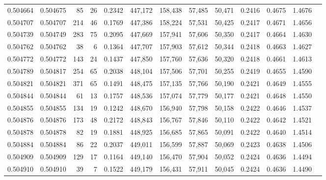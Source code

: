 \begin{tabular}{rrrrrrrrrrrrr}
0.504664 & 0.504675 &    85 &    26 &                                     0.2342 & 447,172 & 158,438 &  57,485 &  50,471 & 0.2416 & 0.4675 & 1.4676 \\
0.504707 & 0.504707 &   214 &    46 &                                     0.1769 & 447,386 & 158,224 &  57,531 &  50,425 & 0.2417 & 0.4671 & 1.4656 \\
0.504739 & 0.504749 &   283 &    75 &                                     0.2095 & 447,669 & 157,941 &  57,606 &  50,350 & 0.2417 & 0.4664 & 1.4630 \\
0.504762 & 0.504762 &    38 &     6 &                                     0.1364 & 447,707 & 157,903 &  57,612 &  50,344 & 0.2418 & 0.4663 & 1.4627 \\
0.504772 & 0.504772 &   143 &    24 &                                     0.1437 & 447,850 & 157,760 &  57,636 &  50,320 & 0.2418 & 0.4661 & 1.4613 \\
0.504789 & 0.504817 &   254 &    65 &                                     0.2038 & 448,104 & 157,506 &  57,701 &  50,255 & 0.2419 & 0.4655 & 1.4590 \\
0.504821 & 0.504821 &   371 &    65 &                                     0.1491 & 448,475 & 157,135 &  57,766 &  50,190 & 0.2421 & 0.4649 & 1.4555 \\
0.504844 & 0.504844 &    61 &    13 &                                     0.1757 & 448,536 & 157,074 &  57,779 &  50,177 & 0.2421 & 0.4648 & 1.4550 \\
0.504855 & 0.504855 &   134 &    19 &                                     0.1242 & 448,670 & 156,940 &  57,798 &  50,158 & 0.2422 & 0.4646 & 1.4537 \\
0.504876 & 0.504876 &   173 &    48 &                                     0.2172 & 448,843 & 156,767 &  57,846 &  50,110 & 0.2422 & 0.4642 & 1.4521 \\
0.504878 & 0.504878 &    82 &    19 &                                     0.1881 & 448,925 & 156,685 &  57,865 &  50,091 & 0.2422 & 0.4640 & 1.4514 \\
0.504884 & 0.504884 &    86 &    22 &                                     0.2037 & 449,011 & 156,599 &  57,887 &  50,069 & 0.2423 & 0.4638 & 1.4506 \\
0.504909 & 0.504909 &   129 &    17 &                                     0.1164 & 449,140 & 156,470 &  57,904 &  50,052 & 0.2424 & 0.4636 & 1.4494 \\
0.504910 & 0.504910 &    39 &     7 &                                     0.1522 & 449,179 & 156,431 &  57,911 &  50,045 & 0.2424 & 0.4636 & 1.4490 \\

\end{tabular}
